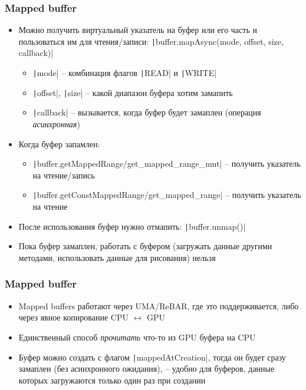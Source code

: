 \documentclass[10pt]{beamer}
\begin{document}
\begin{frame}[fragile]
\frametitle{Mapped buffer}
\begin{itemize}
\item Можно получить виртуальный указатель на буфер или его часть и пользоваться им для чтения/записи: \texttt|buffer.mapAsync(mode, offset, size, callback)|
\pause
\begin{itemize}
\item \texttt|mode| -- комбинация флагов \texttt|READ| и \texttt|WRITE|
\pause
\item \texttt|offset|, \texttt|size| -- какой диапазон буфера хотим замапить
\pause
\item \texttt|callback| -- вызывается, когда буфер будет замаплен (операция \textit{асинхронная})
\end{itemize}
\pause
\item Когда буфер запамлен:
\begin{itemize}
\item \texttt|buffer.getMappedRange/get_mapped_range_mut| -- получить указатель на чтение/запись
\item \texttt|buffer.getConstMappedRange/get_mapped_range| -- получить указатель на чтение
\end{itemize}
\pause
\item После использования буфер нужно отмапить: \texttt|buffer.unmap()|
\pause
\item Пока буфер замаплен, работать с буфером (загружать данные другими методами, использовать данные для рисования) нельзя
\end{itemize}
\end{frame}

\begin{frame}[fragile]
\frametitle{Mapped buffer}
\begin{itemize}
\item Mapped buffers работают через UMA/ReBAR, где это поддерживается, либо через явное копирование CPU \(\leftrightarrow\) GPU
\pause
\item Единственный способ \textit{прочитать} что-то из GPU буфера на CPU
\pause
\item Буфер можно создать с флагом \texttt|mappedAtCreation|, тогда он будет сразу замаплен (без асинхронного ожидания), -- удобно для буферов, данные которых загружаются только один раз при создании
\end{itemize}
\end{frame}
\end{document}
